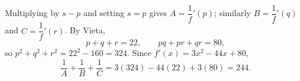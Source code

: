 Multiplying by $s-p$ and setting $s=p$ gives $A=\dfrac{1}{f}'(p)$; similarly $B=\dfrac{1}{f}'(q)$ and $C=\dfrac{1}{f}'(r)$. By Vieta,
\[
p+q+r=22,\qquad pq+pr+qr=80,
\]
so $p^2+q^2+r^2=22^2-160=324$. Since $f'(x)=3x^2-44x+80$,
\[
\dfrac{1}{A}+\dfrac{1}{B}+\dfrac{1}{C}
=3(324)-44(22)+3(80)=\boxed{244}.
\]
